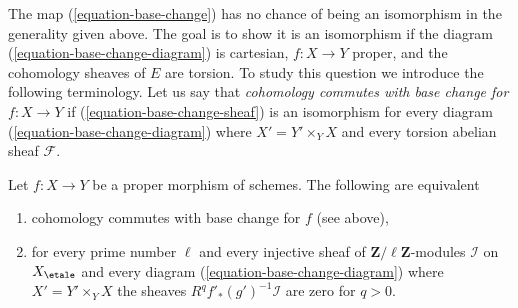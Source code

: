 \medskip\noindent
The map (\ref{equation-base-change}) has no chance of being an isomorphism
in the generality given above. The goal is to show
it is an isomorphism if the diagram (\ref{equation-base-change-diagram})
is cartesian, $f : X \to Y$ proper, and the cohomology sheaves of $E$
are torsion. To study this question we introduce the following terminology.
Let us say that {\it cohomology commutes with base change
for $f : X \to Y$} if (\ref{equation-base-change-sheaf})
is an isomorphism for every diagram (\ref{equation-base-change-diagram})
where $X' = Y' \times_Y X$ and every torsion abelian sheaf $\mathcal{F}$.

\begin{lemma}
\label{lemma-proper-base-change-in-terms-of-injectives}
Let $f : X \to Y$ be a proper morphism of schemes.
The following are equivalent
\begin{enumerate}
\item cohomology commutes with base change for $f$ (see above),
\item for every prime number $\ell$ and every injective
sheaf of $\mathbf{Z}/\ell\mathbf{Z}$-modules $\mathcal{I}$
on $X_\etale$ and every diagram (\ref{equation-base-change-diagram})
where $X' = Y' \times_Y X$ the sheaves
$R^qf'_*(g')^{-1}\mathcal{I}$ are zero for $q > 0$.
\end{enumerate}
\end{lemma}

